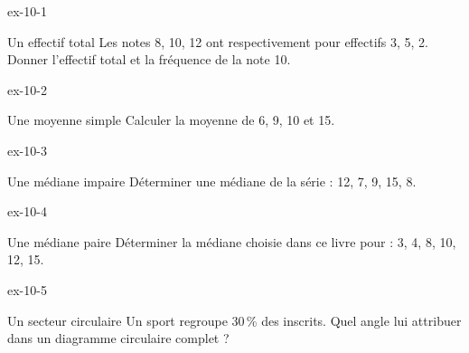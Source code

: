 \clearpage{}
\begin{blocLivre}{ex-10-1}\begin{exercice}[1]{Un effectif total}
Les notes 8, 10, 12 ont respectivement pour effectifs 3, 5, 2. Donner l’effectif total et la fréquence de la note 10.
\end{exercice}\end{blocLivre}
\begin{blocLivre}{ex-10-2}\begin{exercice}[1]{Une moyenne simple}
Calculer la moyenne de 6, 9, 10 et 15.
\end{exercice}\end{blocLivre}
\begin{blocLivre}{ex-10-3}\begin{exercice}[1]{Une médiane impaire}
Déterminer une médiane de la série : 12, 7, 9, 15, 8.
\end{exercice}\end{blocLivre}
\begin{blocLivre}{ex-10-4}\begin{exercice}[1]{Une médiane paire}
Déterminer la médiane choisie dans ce livre pour : 3, 4, 8, 10, 12, 15.
\end{exercice}\end{blocLivre}
\begin{blocLivre}{ex-10-5}\begin{exercice}[1]{Un secteur circulaire}
Un sport regroupe 30\,\% des inscrits. Quel angle lui attribuer dans un diagramme circulaire complet ?
\end{exercice}\end{blocLivre}

